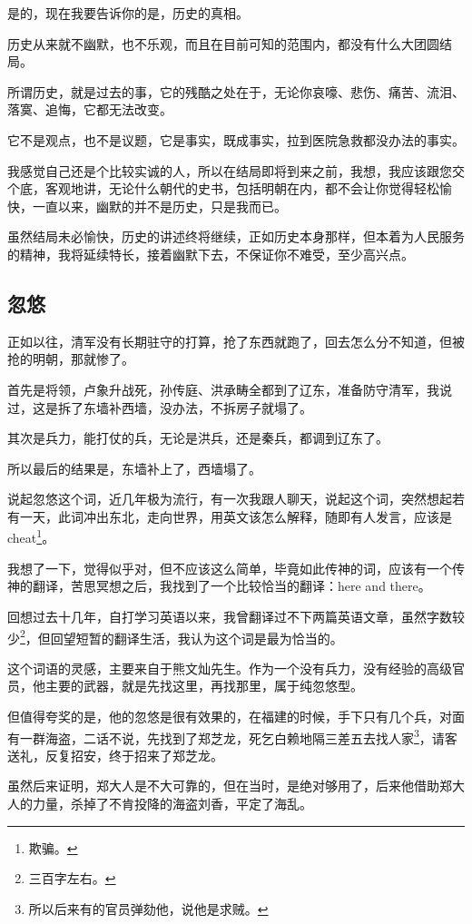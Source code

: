 \begin{multicols}{\theparacolNo}
是的，现在我要告诉你的是，历史的真相。

历史从来就不幽默，也不乐观，而且在目前可知的范围内，都没有什么大团圆结局。

所谓历史，就是过去的事，它的残酷之处在于，无论你哀嚎、悲伤、痛苦、流泪、落寞、追悔，它都无法改变。

它不是观点，也不是议题，它是事实，既成事实，拉到医院急救都没办法的事实。

我感觉自己还是个比较实诚的人，所以在结局即将到来之前，我想，我应该跟您交个底，客观地讲，无论什么朝代的史书，包括明朝在内，都不会让你觉得轻松愉快，一直以来，幽默的并不是历史，只是我而已。

虽然结局未必愉快，历史的讲述终将继续，正如历史本身那样，但本着为人民服务的精神，我将延续特长，接着幽默下去，不保证你不难受，至少高兴点。

\subsection{忽悠}
正如以往，清军没有长期驻守的打算，抢了东西就跑了，回去怎么分不知道，但被抢的明朝，那就惨了。

首先是将领，卢象升战死，孙传庭、洪承畴全都到了辽东，准备防守清军，我说过，这是拆了东墙补西墙，没办法，不拆房子就塌了。

其次是兵力，能打仗的兵，无论是洪兵，还是秦兵，都调到辽东了。

所以最后的结果是，东墙补上了，西墙塌了。

说起忽悠这个词，近几年极为流行，有一次我跟人聊天，说起这个词，突然想起若有一天，此词冲出东北，走向世界，用英文该怎么解释，随即有人发言，应该是cheat\footnote{欺骗。}。

我想了一下，觉得似乎对，但不应该这么简单，毕竟如此传神的词，应该有一个传神的翻译，苦思冥想之后，我找到了一个比较恰当的翻译：here and there。

回想过去十几年，自打学习英语以来，我曾翻译过不下两篇英语文章，虽然字数较少\footnote{三百字左右。}，但回望短暂的翻译生活，我认为这个词是最为恰当的。

这个词语的灵感，主要来自于熊文灿先生。作为一个没有兵力，没有经验的高级官员，他主要的武器，就是先找这里，再找那里，属于纯忽悠型。

但值得夸奖的是，他的忽悠是很有效果的，在福建的时候，手下只有几个兵，对面有一群海盗，二话不说，先找到了郑芝龙，死乞白赖地隔三差五去找人家\footnote{所以后来有的官员弹劾他，说他是求贼。}，请客送礼，反复招安，终于招来了郑芝龙。

虽然后来证明，郑大人是不大可靠的，但在当时，是绝对够用了，后来他借助郑大人的力量，杀掉了不肯投降的海盗刘香，平定了海乱。


\end{multicols}
